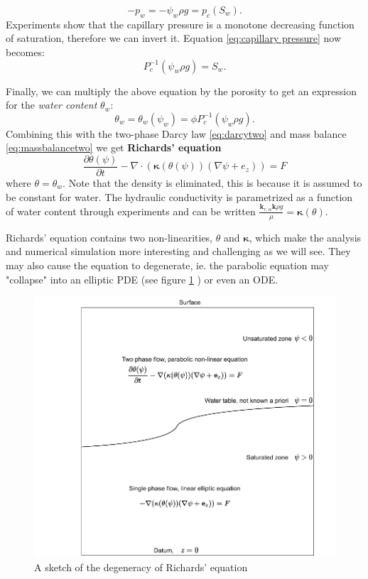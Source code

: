 \documentclass[../Main/main.tex]{subfiles}
\begin{document}
\begin{equation*}\label{eq:groundwater capillary pressure}
	-p_w = -\psi_w\rho g = p_c(S_w).
\end{equation*}
Experiments show that the capillary pressure is a monotone decreasing function of saturation, therefore we can invert it. Equation \eqref{eq:capillary pressure} now becomes:
\begin{equation*}
	P_c^{-1}(\psi_w\rho g) = S_w.
\end{equation*}

Finally, we can multiply the above equation by the porosity to get an expression for the \emph{water content} $\theta_w$:
\begin{equation*}
	\theta_w = \theta_w(\psi_w) = \phi P_c^{-1}(\psi_w\rho g).
\end{equation*}  
Combining this with the two-phase Darcy law \eqref{eq:darcytwo} and mass balance \eqref{eq:massbalancetwo} we get \textbf{Richards' equation}
\begin{equation}\label{eq:richards}
	\frac{\partial \theta(\psi)}{\partial t} - \nabla \cdot (\bm{\kappa} (\theta (\psi))(\nabla \psi + e_z)) = F
\end{equation}
where $\theta = \theta_w$. Note that the density is eliminated, this is because it is assumed to be constant for water. The hydraulic conductivity is parametrized as a function of water content through experiments and can be written  $\frac{\bm{k}_{r,\alpha}\bm{k}\rho g}{\mu} = \bm{\kappa}(\theta)$. \par 
Richards' equation contains two non-linearities, $\theta$ and $\bm{\kappa}$, which make the analysis and numerical simulation more interesting and challenging as we will see. They may also cause the equation to degenerate, ie. the parabolic equation may "collapse" into an elliptic PDE (see figure \ref{fig:richards} ) or even an ODE.
\begin{figure}[h]
	\centering
	\includegraphics[width=\textwidth]{Richards.pdf}
	\caption{A sketch of the degeneracy of Richards' equation}
	\label{fig:richards}
\end{figure}
 
\end{document}
